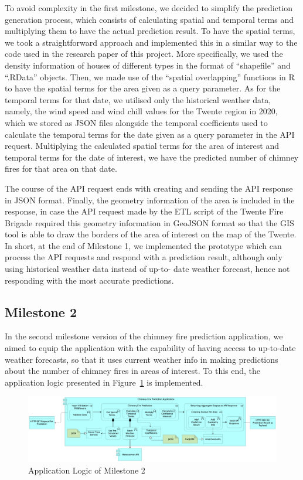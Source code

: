 \documentclass{utitcphd_overleaf}
\begin{document}
To avoid complexity in the first milestone, we decided to simplify the prediction generation process, which consists of calculating spatial and temporal terms and multiplying them to have the actual prediction result. To have the spatial terms, we took a straightforward approach and implemented this in a similar way to the code used in the research paper of this project. More specifically, we used the density information of houses of different types in the format of “shapefile” and “.RData” objects. Then, we made use of the “spatial overlapping” functions in R to have the spatial terms for the area given as a query parameter. As for the temporal terms for that date, we utilised only the historical weather data, namely, the wind speed and wind chill values for the Twente region in 2020, which we stored as JSON files alongside the temporal coefficients used to calculate the temporal terms for the date given as a query parameter in the API request. Multiplying the calculated spatial terms for the area of interest and temporal terms for the date of interest, we have the predicted number of chimney fires for that area on that date.

The course of the API request ends with creating and sending the API response in JSON format. Finally, the geometry information of the area is included in the response, in case the API request made by the ETL script of the Twente Fire Brigade required this geometry information in GeoJSON format so that the GIS tool is able to draw the borders of the area of interest on the map of the Twente. In short, at the end of Milestone 1, we implemented the prototype which can process the API requests and respond with a prediction result, although only using historical weather data instead of up-to- date weather forecast, hence not responding with the most accurate predictions.

\subsection{Milestone 2}
\label{sec:milestone_2}

In the second milestone version of the chimney fire prediction application, we aimed to equip the application with the capability of having access to up-to-date weather forecasts, so that it uses current weather info in making predictions about the number of chimney fires in areas of interest. To this end, the application logic presented in Figure~\ref{fig:m2_logic} is implemented.

\begin{figure}[ht]
  \centering
  \includegraphics[width=1\textwidth]{my_images/milestones/m2.pdf}
  \caption{Application Logic of Milestone 2}
  \label{fig:m2_logic}
\end{figure}
\end{document}
